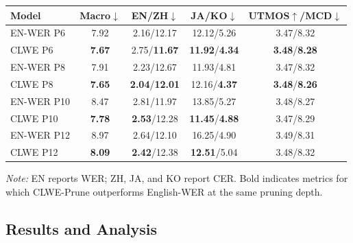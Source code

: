 \documentclass{article}
\begin{document}
\par\smallskip
\noindent\begin{minipage}{\columnwidth}
\centering
{}
\label{tab:criterion_comparison}
\small
\setlength{\tabcolsep}{1.0pt}
\renewcommand{\arraystretch}{1.05}
\begin{tabular}{lcccc}
\toprule
\textbf{Model} &
\textbf{Macro$\downarrow$} &
\textbf{EN/ZH$\downarrow$} &
\textbf{JA/KO$\downarrow$} &
\textbf{UTMOS$\uparrow$/MCD$\downarrow$} \\
\midrule
EN-WER P6 & 7.92 & 2.16/12.17 & 12.12/5.26 & 3.47/8.32 \\
CLWE P6 & \textbf{7.67} & 2.75/\textbf{11.67} & \textbf{11.92}/\textbf{4.34} & \textbf{3.48}/\textbf{8.28} \\
EN-WER P8 & 7.91 & 2.23/12.67 & 11.93/4.81 & 3.47/8.32 \\
CLWE P8 & \textbf{7.65} & \textbf{2.04}/\textbf{12.01} & 12.16/\textbf{4.37} & \textbf{3.48}/\textbf{8.26} \\
EN-WER P10 & 8.47 & 2.81/11.97 & 13.85/5.27 & 3.48/8.27 \\
CLWE P10 & \textbf{7.78} & \textbf{2.53}/12.28 & \textbf{11.45}/\textbf{4.88} & 3.47/8.29 \\
EN-WER P12 & 8.97 & 2.64/12.10 & 16.25/4.90 & 3.49/8.31 \\
CLWE P12 & \textbf{8.09} & \textbf{2.42}/12.38 & \textbf{12.51}/5.04 & 3.48/8.32 \\
\bottomrule
\end{tabular}%

\vspace{0.5mm}
\parbox{\columnwidth}{%
\small
\textit{Note:}
EN reports WER; ZH, JA, and KO report CER.
Bold indicates metrics for which CLWE-Prune outperforms English-WER
at the same pruning depth.
}
\end{minipage}\par\smallskip

\subsection{Results and Analysis}
\label{sec:results}
\end{document}
